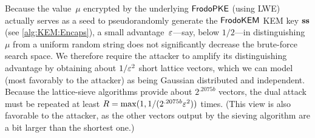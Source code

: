 \documentclass{iacrcc}
\begin{document}
Because the value~$\mu$ encrypted by the underlying $\textsf{\upshape\mdseries FrodoPKE}$ (using
LWE) actually serves as a seed to pseudorandomly generate the
$\textsf{\upshape\mdseries FrodoKEM}$ KEM key $\mathbf{s}\mathbf{s}$ (see \autoref{alg:KEM:Encaps}), a small
advantage~$\varepsilon$---say, below $1/2$---in distinguishing~$\mu$ from a
uniform random string does not significantly decrease the brute-force
search space.
%
We therefore require the attacker to amplify its distinguishing
advantage by obtaining about $1/\varepsilon^2$ short lattice vectors, which
we can model (most favorably to the attacker) as being Gaussian
distributed and independent.
%
Because the lattice-sieve algorithms provide about $2^{.2075 b}$
vectors, the dual attack must be repeated at least
$R = \max(1, 1/(2^{.2075 b} \varepsilon^2))$ times. (This view is also
favorable to the attacker, as the other vectors output by the sieving
algorithm are a bit larger than the shortest one.)
\end{document}
